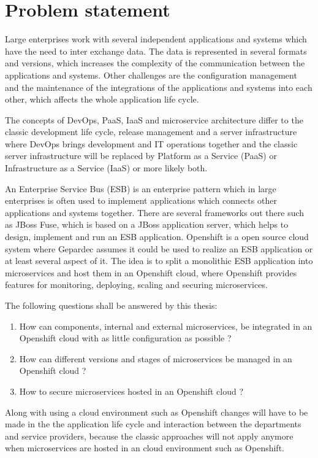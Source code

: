 \section{Problem statement}
\label{sec:statement-of-the-problem}
Large enterprises work with several independent applications and systems which have the need to inter exchange data. The data is represented in several formats and versions, which increases the complexity of the communication between the applications and systems. Other challenges are the configuration management and the maintenance of the integrations of the applications and systems into each other, which affects the whole application life cycle.

The concepts of DevOps, PaaS, IaaS and microservice architecture differ to the classic development life cycle, release management and a server infrastructure where DevOps brings development and IT operations together and the classic server infrastructure will be replaced by Platform as a Service (PaaS) or Infrastructure as a Service (IaaS) or more likely both. 

An Enterprise Service Bus (ESB) is an enterprise pattern which in large enterprises is often used to implement applications which connects other applications and systems together. There are several frameworks out there such as JBoss Fuse\cite{redHatJBossFuse}, which is based on a JBoss application server, which helps to design, implement and run an ESB application. Openshift is a open source cloud system where Gepardec assumes it could be used to realize an ESB application or at least several aspect of it. The idea is to split a monolithic ESB application into microservices and host them in an Openshift cloud, where Openshift provides features for monitoring, deploying, scaling and securing microservices.

The following questions shall be answered by this thesis:
\begin{enumerate}
	\item How can components, internal and external microservices, be integrated in an Openshift cloud with as little configuration as possible ?
	\item How can different versions and stages of microservices be managed in an Openshift cloud ?
	\item How to secure microservices hosted in an Openshift cloud ?
\end{enumerate}
Along with using a cloud environment such as Openshift changes will have to be made in the the application life cycle and interaction between the departments and service providers, because the classic approaches will not apply anymore when microservices are hosted in an cloud environment such as Openshift.

